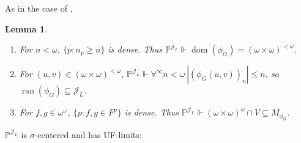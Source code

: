 \documentclass[a4paper,12pt]{amsart}
\newtheorem{lem}[thm]{Lemma}
\theoremstyle{definition}
\numberwithin{thm}{section}
\numberwithin{equation}{section}
\newcommand{\oo}{{\omega}^\omega}
\DeclareMathOperator{\dom}{dom}
\DeclareMathOperator{\ran}{ran}
\newcommand{\J}{\mathscr{J}}
\newcommand{\posetJL}{\mathbb{P}^{\J_L}}
\begin{document}
    As in the case of ,
    
    \begin{lem}\label{lem:posetJL_basics}
    	\begin{enumerate}
    	   \item For $n<\omega$, $\{p:n_p\geq n\}$ is dense. Thus $\posetJL\Vdash\dom(\phi_G)=(\omega\times\omega)^{<\omega}$.
           \item For $(u,v)\in(\omega\times\omega)^{<\omega}$,  $\posetJL\Vdash\forall^\infty n<\omega~|(\phi_G(u,v))_n|\leq n$, so $\ran(\phi_G)\subseteq\J_L$.
    	   \item For $f,g\in \oo$, $\{p:f,g\in F^p\}$ is dense. 
    		Thus $\posetJL\Vdash(\omega\times\omega)^\omega\cap V\subseteq M_{\phi_G}$.
    		\end{enumerate}
    \end{lem}
    
    $\posetJL$ is $\sigma$-centered and has UF-limits:
    
\end{document}

